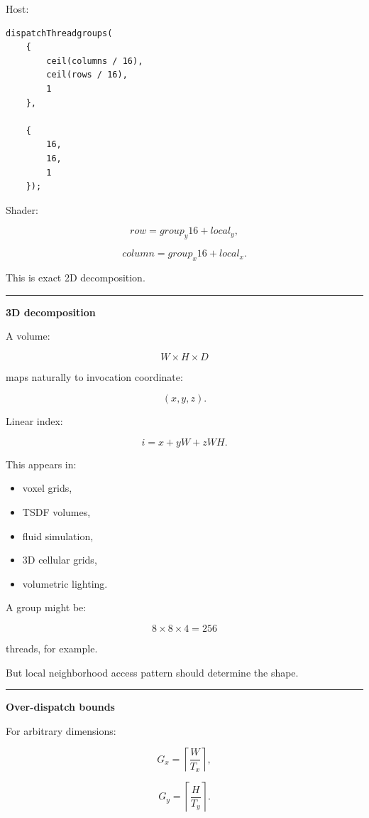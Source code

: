 Host:

\protect{}\label{dgqe6p}%
\begin{verbatim}
dispatchThreadgroups(
    {
        ceil(columns / 16),
        ceil(rows / 16),
        1
    },

    {
        16,
        16,
        1
    });
\end{verbatim}

Shader:

\[
row=
group_y16+local_y,
\]

\[
column=
group_x16+local_x.
\]

This is exact 2D decomposition.

\begin{center}\rule{0.5\linewidth}{0.5pt}\end{center}

\textbf{3D decomposition}

A volume:

\[
W\times H\times D
\]

maps naturally to invocation coordinate:

\[
(x,y,z).
\]

Linear index:

\[
\boxed{
i=
x+
yW+
zWH.
}
\]

This appears in:

\begin{itemize}
\tightlist
\item
  voxel grids,
\item
  TSDF volumes,
\item
  fluid simulation,
\item
  3D cellular grids,
\item
  volumetric lighting.
\end{itemize}

A group might be:

\[
8\times8\times4
=
256
\]

threads, for example.

But local neighborhood access pattern should determine the shape.

\begin{center}\rule{0.5\linewidth}{0.5pt}\end{center}

\textbf{Over-dispatch bounds}

For arbitrary dimensions:

\[
G_x=
\left\lceil\frac{W}{T_x}\right\rceil,
\]

\[
G_y=
\left\lceil\frac{H}{T_y}\right\rceil.
\]

